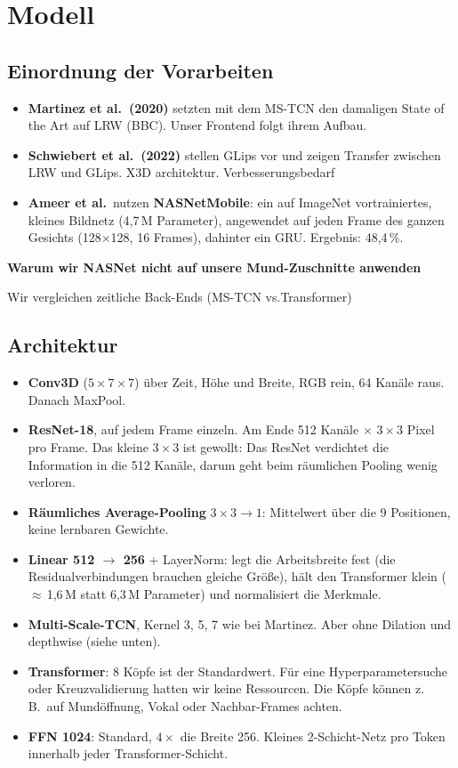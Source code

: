 \documentclass[11pt,a4paper]{article}
\newcommand{\phead}[1]{{\color{bwkiblau}\normalsize\bfseries #1}\par\vspace{0.15cm}}
\begin{document}
\newpage

\section{Modell}

\subsection{Einordnung der Vorarbeiten}
\begin{itemize}
  \item \textbf{Martinez et al.\ (2020)} setzten mit dem MS-TCN den damaligen State of the Art auf
        LRW (BBC). Unser Frontend folgt ihrem Aufbau.
  \item \textbf{Schwiebert et al.\ (2022)} stellen GLips vor und zeigen Transfer zwischen LRW und
        GLips. X3D architektur. Verbesserungsbedarf
  \item \textbf{Ameer et al.}\ nutzen \textbf{NASNetMobile}: ein auf
        ImageNet vortrainiertes, kleines Bildnetz (4,7\,M Parameter), angewendet auf jeden Frame
        des ganzen Gesichts (128$\times$128, 16 Frames), dahinter ein GRU. Ergebnis: 48,4\,\%.
\end{itemize}

\phead{Warum wir NASNet nicht auf unsere Mund-Zuschnitte anwenden}
Wir vergleichen zeitliche Back-Ends (MS-TCN vs.Transformer)


\subsection{Architektur}
\begin{itemize}
  \item \textbf{Conv3D} ($5\times7\times7$) über Zeit, Höhe und Breite, RGB rein, 64 Kanäle raus.
        Danach MaxPool.
  \item \textbf{ResNet-18}, auf jedem Frame einzeln. Am Ende
        512 Kanäle $\times$ $3\times3$ Pixel pro Frame. Das kleine $3\times3$ ist gewollt: Das
        ResNet verdichtet die Information in die 512 Kanäle, darum geht beim räumlichen Pooling
        wenig verloren.
  \item \textbf{Räumliches Average-Pooling} $3\times3 \to 1$: Mittelwert über die 9 Positionen,
        keine lernbaren Gewichte.
  \item \textbf{Linear 512 $\to$ 256} + LayerNorm: legt die Arbeitsbreite fest (die
        Residualverbindungen brauchen gleiche Größe), hält den Transformer klein
        ($\approx$\,1,6\,M statt 6,3\,M Parameter) und normalisiert die Merkmale.
  \item \textbf{Multi-Scale-TCN}, Kernel 3, 5, 7 wie bei Martinez. Aber ohne Dilation und
        depthwise (siehe unten).
  \item \textbf{Transformer}: 8 Köpfe ist der Standardwert. Für eine Hyperparametersuche oder
        Kreuzvalidierung hatten wir keine Ressourcen. Die Köpfe können z.\,B.\ auf
        Mundöffnung, Vokal oder Nachbar-Frames achten.
  \item \textbf{FFN 1024}: Standard, $4\times$ die Breite 256. Kleines 2-Schicht-Netz pro Token
        innerhalb jeder Transformer-Schicht.

\end{itemize}
\end{document}
